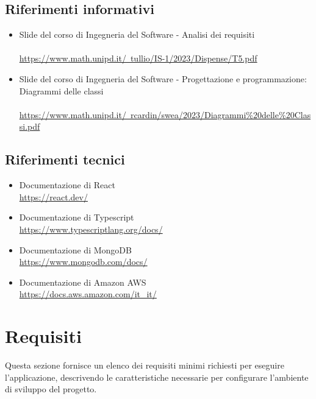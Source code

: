 \documentclass{article}
\begin{document}
\subsection{Riferimenti informativi}
\begin{itemize}
    \item Slide del corso di Ingegneria del Software - Analisi dei requisiti \\ \\
    \href{https://www.math.unipd.it/~tullio/IS-1/2023/Dispense/T5.pdf}{https://www.math.unipd.it/~tullio/IS-1/2023/Dispense/T5.pdf}
    \item Slide del corso di Ingegneria del Software - Progettazione e programmazione: Diagrammi delle classi \\ \\
\href{https://www.math.unipd.it/~rcardin/swea/2023/Diagrammi%20delle%20Classi.pdf}{https://www.math.unipd.it/~rcardin/swea/2023/Diagrammi\%20delle\%20Classi.pdf}
\end{itemize}
\subsection{Riferimenti tecnici}
\begin{itemize}
\item Documentazione di React \\ \href{ https://react.dev/}{ https://react.dev/}
\item Documentazione di Typescript \\ \href{https://www.typescriptlang.org/docs/}{https://www.typescriptlang.org/docs/}
\item Documentazione di MongoDB \\ \href{https://www.mongodb.com/docs/}{https://www.mongodb.com/docs/}
\item Documentazione di Amazon AWS \\ \href{https://docs.aws.amazon.com/it_it/}{https://docs.aws.amazon.com/it\_it/}
\end{itemize}

\section{Requisiti}
Questa sezione fornisce un elenco dei requisiti minimi richiesti per eseguire l'applicazione, descrivendo le caratteristiche necessarie per configurare l'ambiente di sviluppo del progetto.
\end{document}

